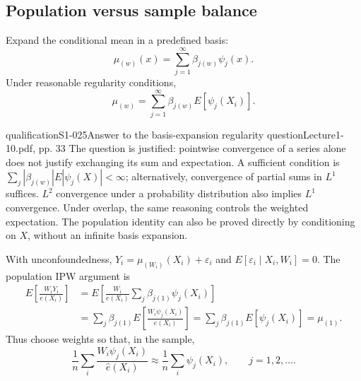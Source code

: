 \subsection{Population versus sample balance}
Expand the conditional mean in a predefined basis:
\[
\mu_{(w)}(x)=\sum_{j=1}^\infty\beta_{j(w)}\psi_j(x).
\]
 Under reasonable regularity conditions,
\[
\mu_{(w)}=\sum_{j=1}^\infty\beta_{j(w)}E[\psi_j(X_i)].
\]
\begin{reviewnote}{qualification}{S1-025}{Answer to the basis-expansion regularity question}{Lecture1-10.pdf, pp. 33}
The question is justified: pointwise convergence of a series alone does not justify exchanging its sum and expectation. A sufficient condition is $\sum_j|\beta_{j(w)}|E|\psi_j(X)|<\infty$; alternatively, convergence of partial sums in $L^1$ suffices. $L^2$ convergence under a probability distribution also implies $L^1$ convergence. Under overlap, the same reasoning controls the weighted expectation. The population identity can also be proved directly by conditioning on $X$, without an infinite basis expansion.
\end{reviewnote}

With unconfoundedness, $Y_i=\mu_{(W_i)}(X_i)+\varepsilon_i$ and $E[\varepsilon_i\mid X_i,W_i]=0$. The population IPW argument is
\begin{align*}
E\left[\frac{W_iY_i}{e(X_i)}\right]
&=E\left[\frac{W_i}{e(X_i)}\sum_j\beta_{j(1)}\psi_j(X_i)\right]\\
&=\sum_j\beta_{j(1)}E\left[\frac{W_i\psi_j(X_i)}{e(X_i)}\right]
=\sum_j\beta_{j(1)}E[\psi_j(X_i)]=\mu_{(1)}.
\end{align*}
 Thus choose weights so that, in the sample,
\[
\frac1n\sum_i\frac{W_i\psi_j(X_i)}{\widehat e(X_i)}
\approx\frac1n\sum_i\psi_j(X_i),\qquad j=1,2,\ldots.
\tag{7.8 in the notes}
\]
